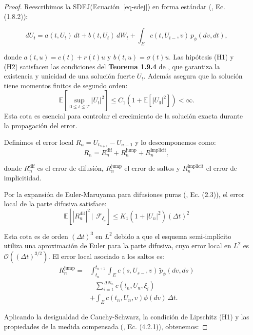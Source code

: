 \documentclass[
  spanish,
  us-letterpaper,
]{scrreprt}
\theoremstyle{plain}
\theoremstyle{plain}
\theoremstyle{definition}
\theoremstyle{remark}
\begin{document}
\begin{proof}
Reescribimos la SDEJ(Ecuación~\ref{eq-sdej}) en forma estándar
(\textcite{platen2010numerical}, Ec. (1.8.2)):

\[dU_t = a(t,U_t)\,dt  + b(t,U_t)\,dW_t + \int_E c(t,U_{t-},v)\,p_\phi(dv, dt),\]

donde \(a(t,u) = c(t) + r(t)u\) y \(b(t,u) = \sigma(t)u\). Las hipótesis
(H1) y (H2) satisfacen las condiciones del \textbf{Teorema 1.9.4} de
\textcite{platen2010numerical}, que garantiza la existencia y unicidad
de una solución fuerte \(U_t\). Además asegura que la solución tiene
momentos finitos de segundo orden:
\[\mathbb{E}\left[ \sup_{0 \leq t \leq T} |U_t|^2 \right] \leq C_1 (1 + \mathbb{E}[|U_0|^2]) < \infty.\]
Esta cota es esencial para controlar el crecimiento de la solución
exacta durante la propagación del error.

Definimos el error local \(R_n = U_{t_{n+1}} - U_{n+1}\) y lo
descomponemos como:
\[R_n = R_n^{\text{dif}} + R_n^{\text{jump}} + R_n^{\text{implicit}},\]

donde \(R_n^{\text{dif}}\) es el error de difusión,
\(R_n^{\text{jump}}\) el error de saltos y \(R_n^{\text{implicit}}\) el
error de implicitidad.

Por la expansión de Euler-Maruyama para difusiones puras
(\textcite{higham2005}, Ec. (2.3)), el error local de la parte difusiva
satisface:
\[\mathbb{E}\left[ |R_n^{\text{dif}}|^2 \mid \mathcal{F_{t_n}} \right] \leq K_1 (1 + |U_n|^2) (\Delta t)^2\]

Esta cota es de orden \((\Delta t)^3\) en \(L^2\) debido a que el
esquema semi-implícito utiliza una aproximación de Euler para la parte
difusiva, cuyo error local en \(L^2\) es
\(\mathcal{O}((\Delta t)^{3/2})\). El error local asociado a los saltos
es: \[\begin{aligned}
R_n^{\text{jump}} = {}& \int_{t_n}^{t_{n+1}} \int_E c(s, U_{s-}, v)\,\tilde{p}_\phi(dv, ds)  \\
& - \sum_{i=1}^{\Delta N_n} c(t_n, U_n, \xi_i)  \\
& + \int_E c(t_n, U_n, v) \phi(dv)\,\Delta t.
\end{aligned}\]

Aplicando la desigualdad de Cauchy-Schwarz, la condición de Lipschitz
(H1) y las propiedades de la medida compensada
(\textcite{platen2010numerical}, Ec. (4.2.1)), obtenemos:


\end{proof}
\end{document}
